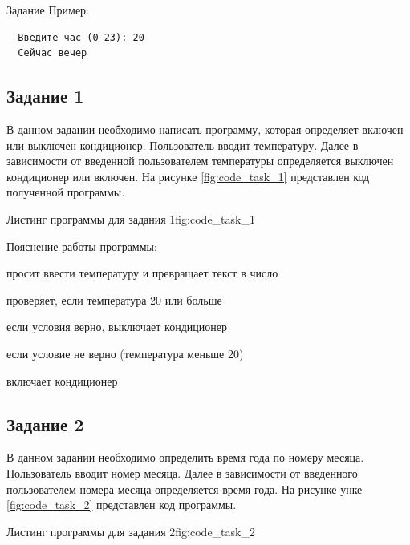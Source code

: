 \documentclass[]{vvsu}
\begin{document}
\begin{addition}{Задание}
  Пример:
  \begin{verbatim}
  Введите час (0–23): 20  
  Сейчас вечер\end{verbatim}

\subsection{Задание 1} 
В данном задании необходимо написать программу, которая определяет включен или выключен кондиционер.
Пользователь вводит температуру. Далее в зависимости от введенной пользователем температуры определяется выключен кондиционер или включен.
На рисунке \ref{fig:code_task_1} представлен код полученной программы.

\begin{vvsu_figure}{Листинг программы для задания 1}{fig:code_task_1}
  \begin{minipage}{.75\textwidth}
    
  \end{minipage}
\end{vvsu_figure}

Пояснение работы программы:
\begin{vvsu_list}
  \item просит ввести температуру и превращает текст в число
  \item проверяет, если температура 20 или больше
  \item если условия верно, выключает кондиционер
  \item если условие не верно (температура меньше 20)
  \item включает кондиционер
\end{vvsu_list}

\subsection{Задание 2}

В данном задании необходимо определить время года по номеру месяца.
Пользователь вводит номер месяца. Далее в зависимости от введенного пользователем номера месяца определяется время года.
На рисунке унке \ref{fig:code_task_2} представлен код программы.

\begin{vvsu_figure}{Листинг программы для задания 2}{fig:code_task_2}
  \begin{minipage}{.75\textwidth}
    
  \end{minipage}
\end{vvsu_figure}


\end{addition}
\end{document}
